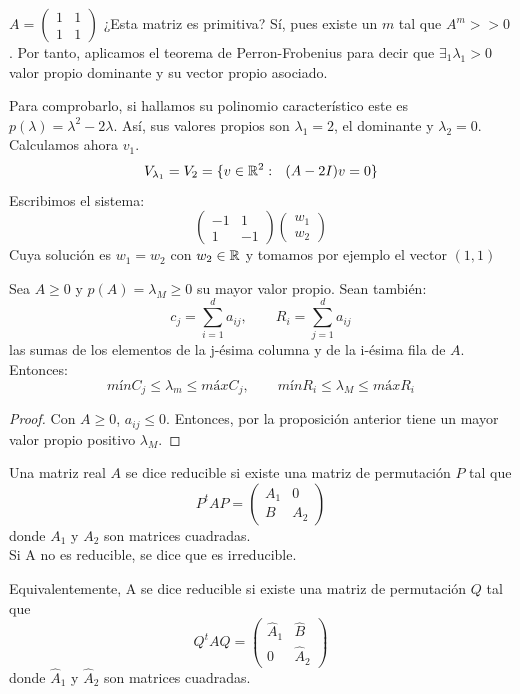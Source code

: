 \begin{ejemplo}
	$A = \begin{pmatrix}
 1 & 1 \\
 1 & 1
\end{pmatrix} $ ¿Esta matriz es primitiva? Sí, pues existe un $m$ tal que $A^m >>0$. Por tanto, aplicamos el teorema de Perron-Frobenius para decir que $\exists_1 \lambda_1 > 0$ valor propio dominante y su vector propio asociado.

Para comprobarlo, si hallamos su polinomio característico este es $p(\lambda) = \lambda^2 -2\lambda$. Así, sus valores propios son $\lambda_1 = 2$, el dominante y $\lambda_2 = 0$. Calculamos ahora $v_1$.
\[
V_{\lambda_1} = V_2 = \{v \in \R^2 : \ \ (A-2I)v = 0\}
\]
Escribimos el sistema:
\[
\begin{pmatrix}
 -1 & 1\\
 1 & -1
\end{pmatrix} \begin{pmatrix}
 w_1\\
 w_2
\end{pmatrix}
\]
Cuya solución es $w_1 = w_2$ con $w_2 \in \mathbb{R}$ y tomamos por ejemplo el vector $(1,1)$
\end{ejemplo}

\begin{nprop}
	Sea $A\geq 0$ y $p(A) = \lambda_M \geq 0$ su mayor valor propio. Sean también:
	\[
	c_j = \sum_{i=1}^d a_{ij}, \quad \quad R_i= \sum_{j=1}^d a_{ij}
	\]
	las sumas de los elementos de la j-ésima columna y de la i-ésima fila de $A$. Entonces:
	\[
	mín C_j \leq \lambda_m \leq máx C_j , \quad \quad mín R_i \leq \lambda_M \leq máx R_i
	\]
\end{nprop}
\begin{proof}
	Con $A\geq 0$, $a_{ij} \leq 0$. Entonces, por la proposición anterior tiene un mayor valor propio positivo $\lambda_M$.
\end{proof}

\begin{ndef}
	Una matriz real $A$ se dice reducible si existe una matriz de permutación $P$ tal que
	$$P^{t}AP =
	\begin{pmatrix}
	A_{1} & 0 \\
	B & A_{2}
	\end{pmatrix}$$
donde $A_{1}$ y $A_{2}$ son matrices cuadradas. \\
Si A no es reducible, se dice que es irreducible.
\end{ndef}
Equivalentemente, A se dice reducible si existe una matriz de permutación $Q$ tal que
$$ Q^{t}	AQ =
\begin{pmatrix}
\hat{A}_{1} & \hat{B} \\
0 & \hat{A}_{2}
\end{pmatrix}$$
donde $\hat{A}_{1}$ y $\hat{A}_{2}$ son matrices cuadradas.

